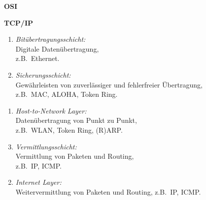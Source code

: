 \documentclass[a4paper,parskip=half*,DIV=15,fontsize=11pt]{scrartcl}
\newlength{\currentparskip}
\newenvironment{minipageparskip}
  {\setlength{\currentparskip}{\parskip} %
   \begin{minipage}{\textwidth} %
   \setlength{\parskip}{\currentparskip} %
  }
  {\end{minipage}}
\begin{document}
\begin{minipageparskip}
\begin{minipage}{0.45\textwidth}
\centering
\textbf{OSI}
\end{minipage}\hspace{0.05\textwidth}
\begin{minipage}{0.45\textwidth}
\centering
\textbf{TCP/IP}
\end{minipage}

\begin{minipage}{0.45\textwidth}
\begin{enumerate}[nolistsep]
	\item \emph{Bitübertragungsschicht:}\\ Digitale Datenübertragung,\\ z.B.\ Ethernet.
	\item \emph{Sicherungsschicht:}\\ Gewährleisten von zuverlässiger und fehlerfreier Übertragung,\\ z.B.\ MAC, ALOHA, Token Ring.
\end{enumerate}
\end{minipage}\hspace{0.05\textwidth}
\begin{minipage}{0.45\textwidth}
\centering
\begin{enumerate}
	\item \emph{Host-to-Network Layer:}\\ Datenübertragung von Punkt zu Punkt,\\ z.B.\ WLAN, Token Ring, (R)ARP.
\end{enumerate}
\end{minipage}

\begin{minipage}{0.45\textwidth}
\begin{enumerate}
    \setcounter{enumi}{2}
    \item \emph{Vermittlungsschicht:}\\ Vermittlung von Paketen und Routing,\\ z.B.\ IP, ICMP.
\end{enumerate}
\end{minipage}\hspace{0.05\textwidth}
\begin{minipage}{0.45\textwidth}
\begin{enumerate}
    \setcounter{enumi}{1}
    \item \emph{Internet Layer:}\\ Weitervermittlung von Paketen und Routing, z.B.\ IP, ICMP.
\end{enumerate}
\end{minipage}


\end{minipageparskip}
\end{document}
